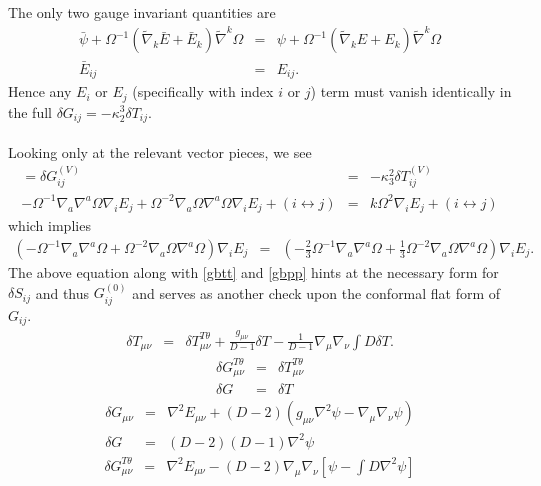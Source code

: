 \documentclass[10pt,letterpaper]{article}
\numberwithin{equation}{section}
\begin{document}
The only two gauge invariant quantities are 
\begin{eqnarray}
\bar \psi + \Omega^{-1}(\tilde\nabla_k \bar E + \bar E_k)\tilde\nabla^k \Omega
&=& \psi + \Omega^{-1}(\tilde\nabla_k  E +  E_k)\tilde\nabla^k \Omega
\nonumber\\
\bar E_{ij} &=& E_{ij}.
\end{eqnarray}
Hence any $E_i$ or $E_j$ (specifically with index $i$ or $j$) term must vanish identically in the full $\delta G_{ij} = -\kappa_2^3\delta T_{ij}$. 
\\ \\
Looking only at the relevant vector pieces, we see
\begin{eqnarray}=
\delta G_{ij}^{(V)} &=& -\kappa^2_3\delta T_{ij}^{(V)}
\nonumber\\
 -  \Omega^{-1} \nabla_{a}\nabla^{a}\Omega \nabla_{i}E_{j}
 + \Omega^{-2} \nabla_{a}\Omega \nabla^{a}\Omega \nabla_{i}E_{j}
+(i\leftrightarrow j)&=& k\Omega^2 \nabla_i E_j+(i\leftrightarrow j)
\end{eqnarray}
which implies
\begin{eqnarray}
\left(-\Omega^{-1} \nabla_{a}\nabla^{a}\Omega
 + \Omega^{-2} \nabla_{a}\Omega \nabla^{a}\Omega\right) \nabla_{i}E_{j} &=&\left(-\tfrac23\Omega^{-1} \nabla_a\nabla^a \Omega + \tfrac13\Omega^{-2} \nabla_a\Omega \nabla^a\Omega\right)\nabla_i E_j.
\end{eqnarray}
The above equation along with \eqref{gbtt} and \eqref{gbpp} hints at the necessary form for $\delta S_{ij}$ and thus $G_{ij}^{(0)}$ and serves as another check upon the conformal flat form of $G_{ij}$.
\newpage
\begin{eqnarray}
\delta T_{\mu\nu} &=& \delta T_{\mu\nu}^{T\theta} + \frac{g_{\mu\nu}}{D-1}\delta T - \frac{1}{D-1}\nabla_\mu\nabla_\nu \int D \delta T.
\end{eqnarray}
\begin{eqnarray}
\delta G_{\mu\nu}^{T\theta} &=& \delta T_{\mu\nu}^{T\theta}
\nonumber\\
\delta G &=& \delta T
\end{eqnarray}
\begin{eqnarray}
\delta G_{\mu\nu} &=& \nabla^2 E_{\mu\nu} + (D-2) ( g_{\mu\nu}\nabla^2 \psi-\nabla_\mu\nabla_\nu \psi)
\nonumber\\
\delta G &=& (D-2)(D-1)\nabla^2 \psi 
\end{eqnarray}
\begin{eqnarray}
\delta G_{\mu\nu}^{T\theta} &=& \nabla^2 E_{\mu\nu} - (D-2)\nabla_\mu\nabla_\nu \left[\psi - \int D \nabla^2\psi\right]
\end{eqnarray}
\end{document}
